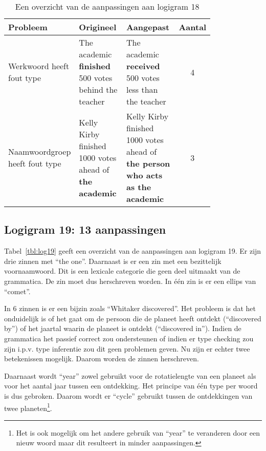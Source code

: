 \begin{table}[h]
  \centering
  \begin{tabular}{p{0.2\linewidth}p{0.3\linewidth}p{0.3\linewidth}c}
    \toprule
    \textbf{Probleem} & \textbf{Origineel} & \textbf{Aangepast} & \textbf{Aantal} \\ 
    \hline
    Werkwoord heeft fout type & The academic \textbf{finished} 500 votes behind the teacher & The academic \textbf{received} 500 votes less than the teacher & 4 \\
    \hline
    Naamwoordgroep heeft fout type & Kelly Kirby finished 1000 votes ahead of \textbf{the academic} & Kelly Kirby finished 1000 votes ahead of \textbf{the person who acts as the academic} & 3 \\
    \bottomrule
  \end{tabular}
  \caption{Een overzicht van de aanpassingen aan logigram 18}
  \label{tbl:log18}
\end{table}

\subsection{Logigram 19: 13 aanpassingen}
Tabel~\ref{tbl:log19} geeft een overzicht van de aanpassingen aan logigram 19. Er zijn drie zinnen met ``the one''. Daarnaast is er een zin met een bezittelijk voornaamwoord. Dit is een lexicale categorie die geen deel uitmaakt van de grammatica. De zin moet dus herschreven worden. In één zin is er een ellips van ``comet''.

In 6 zinnen is er een bijzin zoals ``Whitaker discovered''. Het probleem is dat het onduidelijk is of het gaat om de persoon die de planeet heeft ontdekt (``discovered by'') of het jaartal waarin de planeet is ontdekt (``discovered in''). Indien de grammatica het passief correct zou ondersteunen of indien er type checking zou zijn i.p.v. type inferentie zou dit geen problemen geven. Nu zijn er echter twee betekenissen mogelijk. Daarom worden de zinnen herschreven.

Daarnaast wordt ``year'' zowel gebruikt voor de rotatielengte van een planeet als voor het aantal jaar tussen een ontdekking. Het principe van één type per woord is dus gebroken. Daarom wordt er ``cycle'' gebruikt tussen de ontdekkingen van twee planeten\footnote{Het is ook mogelijk om het andere gebruik van ``year'' te veranderen door een nieuw woord maar dit resulteert in minder aanpassingen.}.

